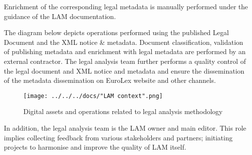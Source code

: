 Enrichment of the corresponding legal metadata is manually performed
under the guidance of the LAM documentation.

The diagram below depicts operations performed using the published Legal
Document and the XML notice \& metadata. Document classification,
validation of publishing metadata and enrichment with legal metadata are
performed by an external contractor. The legal analysis team further
performs a quality control of the legal document and XML notice and
metadata and ensure the dissemination of the metadata dissemination on
EuroLex website and other channels.

\begin{figure}[!ht]
\centering
\texttt{[image: ../../../docs/"LAM context".png]}
\caption{Digital assets and operations related to legal
analysis methodology}
\end{figure}

In addition, the legal analysis team is the LAM owner and main editor.
This role implies collecting feedback from various stakeholders and
partners; initiating projects to harmonise and improve the quality of
LAM itself.
